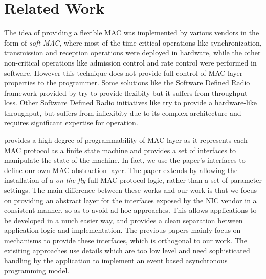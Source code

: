 \section{Related Work}
\label{sec:related}

The idea of providing a flexible MAC was implemented by various vendors in the form of \textit{soft-MAC}\cite{softmac}, where most of the time critical operations like synchronization, transmission and reception operations were deployed in hardware, while the other non-critical operations like admission control and rate control were performed in software. However this technique does not provide full control of MAC layer properties to the programmer. Some solutions like the Software Defined Radio framework provided by \cite{gnuradio} try to provide flexibity but it suffers from throughput loss. Other Software Defined Radio initiatives like \cite{sora} try to provide a hardware-like throughput, but suffers from inflexibity due to its complex architecture and requires significant expertise for operation. 

\cite{macproc} provides a high degree of programmability of MAC layer as it represents each MAC protocol as a finite state machine and provides a set of interfaces to manipulate the state of the machine. In fact, we use the paper's interfaces to define our own MAC abstraction layer. The paper \cite{maclet} extends \cite{macproc} by allowing the installation of a \textit{on-the-fly} full MAC protocol logic, rather than a set of parameter settings. The main difference between these works and our work is that we focus on providing an abstract layer for the interfaces exposed by the NIC vendor in a consistent manner, so as to avoid ad-hoc approaches. This allows applications to be developed in a much easier way, and provides a clean separation between application logic and implementation. The previous papers mainly focus on mechanisms to provide these interfaces, which is orthogonal to our work. The exisiting approaches use details which are too low level and need sophisticated handling by the application to implement an event based asynchronous programming model.  
